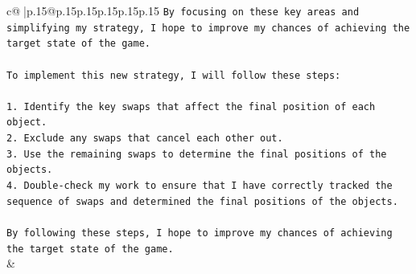 \documentclass{article}
\begin{document}
{\begin{supertabular}{c@{$\;$}|p{.15\linewidth}@{}p{.15\linewidth}p{.15\linewidth}p{.15\linewidth}p{.15\linewidth}p{.15\linewidth}}
{{{\texttt{By focusing on these key areas and simplifying my strategy, I hope to improve my chances of achieving the target state of the game.} \\
\\ 
\texttt{To implement this new strategy, I will follow these steps:} \\
\\ 
\texttt{1. Identify the key swaps that affect the final position of each object.} \\
\texttt{2. Exclude any swaps that cancel each other out.} \\
\texttt{3. Use the remaining swaps to determine the final positions of the objects.} \\
\texttt{4. Double{-}check my work to ensure that I have correctly tracked the sequence of swaps and determined the final positions of the objects.} \\
\\ 
\texttt{By following these steps, I hope to improve my chances of achieving the target state of the game.} \\
            }
        }
    }
    & \\ \\

\end{supertabular}
}
\end{document}
